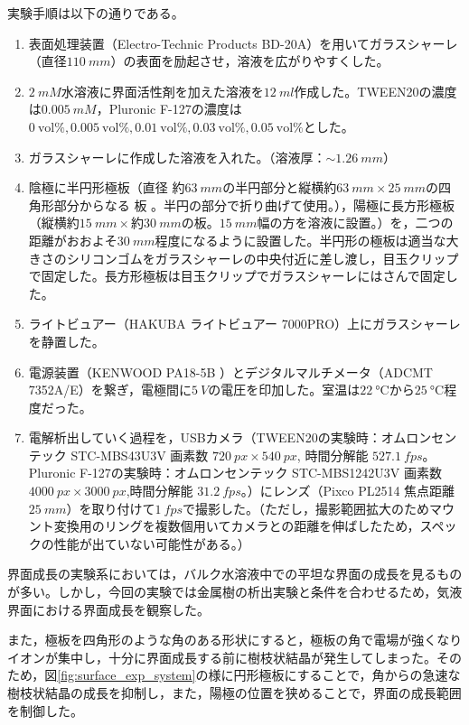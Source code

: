 \documentclass[autodetect-engine,dvi=dvipdfmx,a4paper,ja=standard,oneside,openany,11pt]{bxjsbook}
\begin{document}
実験手順は以下の通りである。
\begin{enumerate}
  \item 表面処理装置（Electro-Technic Products BD-20A）を用いてガラスシャーレ（直径$\SI{110}{mm}$）の表面を励起させ，溶液を広がりやすくした。
  \item  {} $\SI{2}{mM}$水溶液に界面活性剤を加えた溶液を$\SI{12}{ml}$作成した。TWEEN20の濃度は$\SI{0.005}{mM}$，Pluronic F-127の濃度は$\SI{0}{\mathrm{vol}\%}, \SI{0.005}{\mathrm{vol}\%}, \SI{0.01}{\mathrm{vol}\%}, \SI{0.03}{\mathrm{vol}\%}, \SI{0.05}{\mathrm{vol}\%}$とした。
  \item ガラスシャーレに作成した溶液を入れた。（溶液厚：$\sim\SI{1.26}{mm}$）
  \item 陰極に半円形極板（直径 約$\SI{63}{mm}$の半円部分と縦横約$\SI{63}{mm}\times \SI{25}{mm}$の四角形部分からなる 板 。半円の部分で折り曲げて使用。），陽極に長方形極板（縦横約$\SI{15}{mm}\times$約$\SI{30}{mm}$の板。$\SI{15}{mm}$幅の方を溶液に設置。）を，二つの距離がおおよそ$\SI{30}{mm}$程度になるように設置した。半円形の極板は適当な大きさのシリコンゴムをガラスシャーレの中央付近に差し渡し，目玉クリップで固定した。長方形極板は目玉クリップでガラスシャーレにはさんで固定した。
  \item ライトビュアー（HAKUBA ライトビュアー 7000PRO）上にガラスシャーレを静置した。
  \item 電源装置（KENWOOD PA18-5B ）とデジタルマルチメータ（ADCMT 7352A/E）を繋ぎ，電極間に$\SI{5}{V}$の電圧を印加した。室温は$\SI{22}{\degreeCelsius}$から$\SI{25}{\degreeCelsius}$程度だった。
  \item 電解析出していく過程を，USBカメラ（TWEEN20の実験時：オムロンセンテック STC-MBS43U3V 画素数 $\SI{720}{px} \times \SI{540}{px}$, 時間分解能 $\SI{527.1}{fps}$。Pluronic F-127の実験時：オムロンセンテック STC-MBS1242U3V 画素数 $\SI{4000}{px} \times \SI{3000}{px}$,時間分解能 $\SI{31.2}{fps}$。）にレンズ（Pixco PL2514 焦点距離$\SI{25}{mm}$）を取り付けて$\SI{1}{fps}$で撮影した。（ただし，撮影範囲拡大のためマウント変換用のリングを複数個用いてカメラとの距離を伸ばしたため，スペックの性能が出ていない可能性がある。）
\end{enumerate}

界面成長の実験系においては，バルク水溶液中での平坦な界面の成長を見るものが多い\cite{schilardi1998evolution}。しかし，今回の実験では金属樹の析出実験と条件を合わせるため，気液界面における界面成長を観察した。

また，極板を四角形のような角のある形状にすると，極板の角で電場が強くなりイオンが集中し，十分に界面成長する前に樹枝状結晶が発生してしまった。そのため，図\ref{fig:surface_exp_system}の様に円形極板にすることで，角からの急速な樹枝状結晶の成長を抑制し，また，陽極の位置を狭めることで，界面の成長範囲を制御した。
\end{document}
